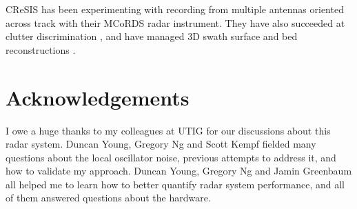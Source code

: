 \documentclass[11pt]{article}
\begin{document}
CReSIS has been experimenting with recording from multiple antennas oriented across track with their MCoRDS radar instrument.
They have also succeeded at clutter discrimination \cite{Gogineni2014}, and have managed 3D swath surface and bed reconstructions \cite{Wu2011}.

\section*{Acknowledgements}
I owe a huge thanks to my colleagues at UTIG for our discussions about this radar system. 
Duncan Young, Gregory Ng and Scott Kempf fielded many questions about the local oscillator noise, previous attempts to address it, and how to validate my approach. 
Duncan Young, Gregory Ng and Jamin Greenbaum all helped me to learn how to better quantify radar system performance, and all of them answered questions about the hardware.

{\footnotesize {}}
 
\end{document}
